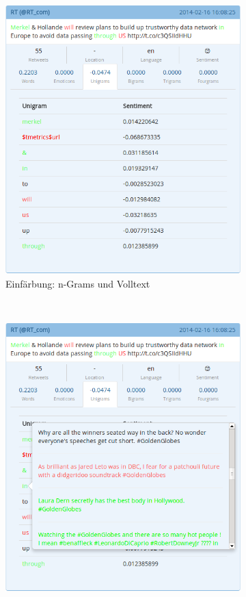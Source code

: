 \begin{figure}[ht]
\centering
\begin{subfigure}[t]{0.45\textwidth}
\includegraphics[width=\textwidth]{Bilder/Frontend/SentimentTweetsColors.png}
\caption{Einfärbung: n-Grams und Volltext}
\label{sentimenttweetscolors}
\end{subfigure}
~
\begin{subfigure}[t]{0.45\textwidth}
\includegraphics[width=\textwidth]{Bilder/Frontend/SentimentTrainingstweets.png}

\end{subfigure}
\end{figure}
